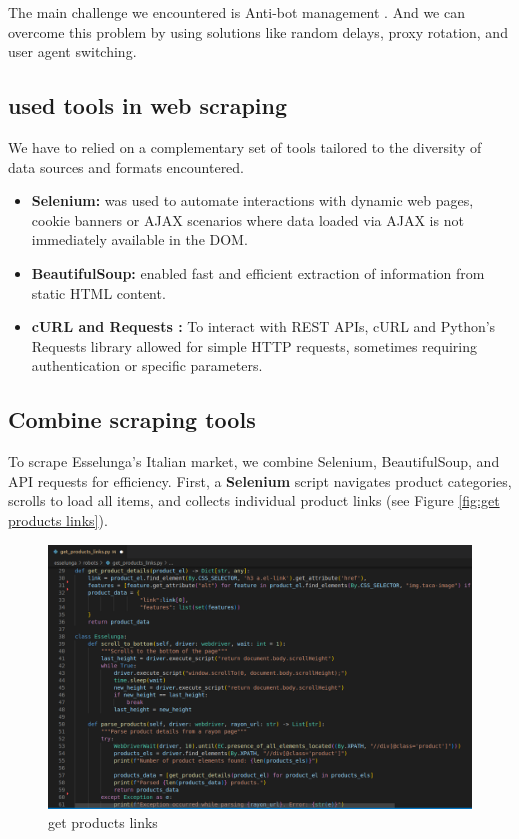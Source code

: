 The main challenge  we encountered is Anti-bot management . And we can overcome this problem by using solutions like random delays, proxy rotation, and user agent switching.


\subsection{used tools in web scraping}
We have to relied on a complementary set of tools tailored to the diversity of data sources and formats encountered.
\begin{itemize}
    \item \textbf{Selenium:} was used to automate interactions with dynamic web pages, cookie banners or  AJAX scenarios where data loaded via AJAX is not immediately available in the DOM.
    \item \textbf{BeautifulSoup:}  enabled fast and efficient extraction of information from static HTML content.
    \item \textbf{cURL and Requests :} To interact with REST APIs, cURL and Python’s Requests library allowed for simple HTTP requests, sometimes requiring authentication or specific parameters. 
\end{itemize}

\subsection{Combine scraping tools}
To scrape Esselunga's Italian market, we combine Selenium, BeautifulSoup, and API requests for efficiency. First, a \textbf{Selenium} script navigates product categories, scrolls to load all items, and collects individual product links (see Figure \ref{fig:get products links}).
\begin{figure}[H]
            \centering
            \includegraphics[scale=0.42]{images/get_products_links.png}
            \caption{get products links} 
            \label{fig:get_products_links}
\end{figure}

